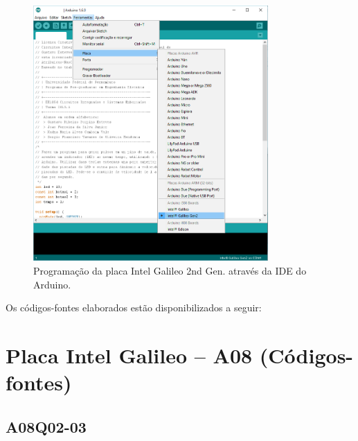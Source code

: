 \documentclass[
	12pt,				%
	openright,			%
  oneside,     %
	a4paper,			%
	english,			%
	french,				%
	spanish,			%
	brazil				%
	]{abntex2}
\begin{document}
\newpage

\begin{figure}[ht]
  \centering
  \caption{\label{fig:cha-8-IDE-GALILEO-GEN2}Programação da placa Intel Galileo 2nd Gen. através da IDE do Arduino.}
  \includegraphics[width=0.8\textwidth]{images/Atividade08/IDE-GALILEO-GEN2.png}
\end{figure}


\newpage
Os códigos-fontes elaborados estão disponibilizados a seguir:
\section*{Placa Intel Galileo -- A08 (Códigos-fontes)}
\label{sec:IntelGalileo}
\subsection*{A08Q02-03}








\end{document}
